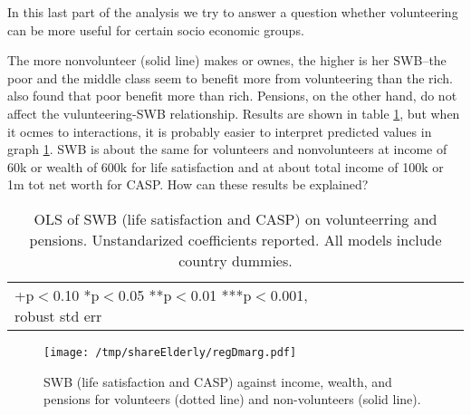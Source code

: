 \documentclass[10pt, letterpaper]{article}
\begin{document}
\begin{spacing}{1.4}
In this last part of the analysis we try to answer a question whether
volunteering can be more useful for certain socio economic groups. %

The more nonvolunteer (solid line) makes or ownes, the higher is her SWB--the poor and the middle
class seem to benefit more from volunteering than the rich. \citet{dulin2012volunteering} also found that poor benefit more than rich. Pensions, on the
other hand, do not affect the vulunteering-SWB relationship.
 Results are shown in
table \ref{regDw6}, but when it ocmes to interactions, it is probably easier to
interpret predicted values in graph \ref{mar}.
%
SWB is about the same for volunteers and nonvolunteers at income of 60k or
wealth of 600k for life satisfaction and 
at about total income of 100k or 1m tot net worth for CASP.  
% 
How can these results be explained?

\begin{spacing}{.9}
\begin{table}[H]\centering \caption{OLS of SWB  (life satisfaction and CASP) on
    volunteerring and pensions.  Unstandarized coefficients reported. All models
    include country dummies.}  \begin{scriptsize} \begin{tabular}{p{1.8in}p{.5in}p{.5in}p{.5in}p{.5in}|p{.5in}p{.5in}p{.5in}p{.5in}p{.5in}p{.4in}p{.5in}p{.4in}}\hline 
      \hline\multicolumn{5}{l}{+p$<$0.10 *p$<$0.05 **p$<$0.01 ***p$<$0.001,
        robust std err} \end{tabular}\label{regDw6} \end{scriptsize}\end{table}
\end{spacing}


\begin{figure}[h!]
  \centering
\texttt{[image: /tmp/shareElderly/regDmarg.pdf]}  
  \caption{SWB  (life satisfaction and CASP) against income, wealth, and
    pensions for volunteers (dotted line) and non-volunteers (solid line).}
  \label{mar}
\end{figure}






\end{spacing}
\end{document}
